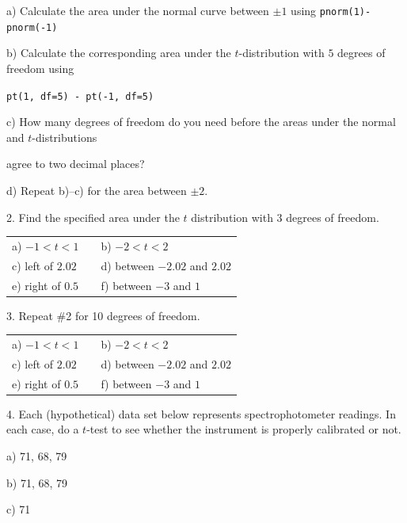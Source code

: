 \documentclass[10pt]{article}
\begin{document}
\hspace{20pt} a) Calculate the area under the normal curve between 
  $\pm 1$  using \lstinline!pnorm(1)-pnorm(-1)!
\bigskip

\hspace{20pt} b) Calculate the corresponding area under the $t$-distribution with 
$5$ degrees of freedom using\vspace{-4pt}

\HH \lstinline!pt(1, df=5) - pt(-1, df=5)!
\bigskip

\hspace{20pt} c) How many degrees of freedom do you need before the areas 
  under the normal and $t$-distributions\vspace{-4pt}

\HH agree to two decimal places?
\bigskip

\hspace{20pt} d) Repeat b)--c) for the area between $\pm 2$.
\bigskip

2. Find the specified area under the $t$ distribution with $3$ degrees of freedom.\vspace{-8pt}
\begin{center}
\begin{tabular}{lcl}
a) $-1 < t < 1$ & \hspace{3in} & b) $-2 < t < 2$\\[10pt]
c) left of $2.02$ & & d) between $-2.02$ and $2.02$\\[10pt]
e) right of $0.5$ & & f) between $-3$ and $1$\\[10pt]
\end{tabular}
\end{center}


3. Repeat \#2 for 10 degrees of freedom.\vspace{-8pt}
\begin{center}
\begin{tabular}{lcl}
a) $-1 < t < 1$ & \hspace{3in} & b) $-2 < t < 2$\\[10pt]
c) left of $2.02$ & & d) between $-2.02$ and $2.02$\\[10pt]
e) right of $0.5$ & & f) between $-3$ and $1$\\[10pt]
\end{tabular}
\end{center}

4. Each (hypothetical) data set below represents spectrophotometer readings.
In each case, do a $t$-test to see whether the instrument is properly
calibrated or not.

\hspace{10pt} a) 71, 68, 79
\vspace{1.5in}

\hspace{10pt} b) 71, 68, 79
\vspace{1.5in}

\hspace{10pt} c) 71
\vfill
\eject
\end{document}
